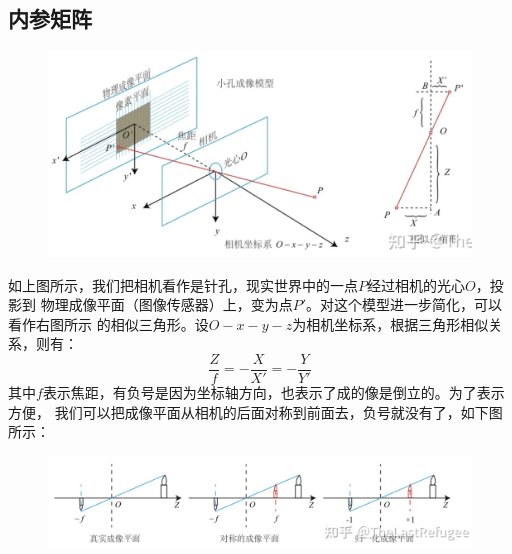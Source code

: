 \documentclass[11pt]{article}
\begin{document}
\subsection{内参矩阵}
\begin{figure}[htb]
    \centering
    \includegraphics[scale=0.3]{imgs/camera.png}
\end{figure}

如上图所示，我们把相机看作是针孔，现实世界中的一点$P$经过相机的光心$O$，投影到
物理成像平面（图像传感器）上，变为点$P'$。对这个模型进一步简化，可以看作右图所示
的相似三角形。设$O-x-y-z$为相机坐标系，根据三角形相似关系，则有：
\begin{equation}
    \frac{Z}{f} = -\frac{X}{X'} = -\frac{Y}{Y'}
\end{equation}
其中$f$表示焦距，有负号是因为坐标轴方向，也表示了成的像是倒立的。为了表示方便，
我们可以把成像平面从相机的后面对称到前面去，负号就没有了，如下图所示：

\begin{figure}[htb]
    \centering
    \includegraphics[scale=0.3]{imgs/img_plane.png}
\end{figure} 
\end{document}
